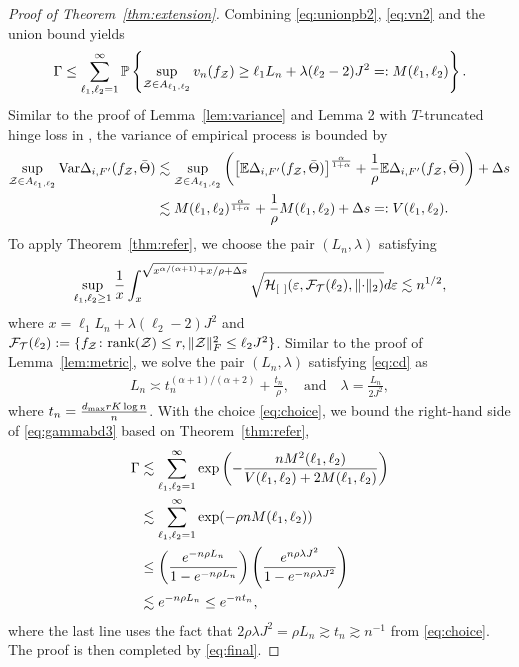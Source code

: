 \documentclass[twoside,11pt]{article}
\theoremstyle{plain}
\theoremstyle{definition}
\begin{document}
\begin{proof}[Proof of Theorem~\ref{thm:extension}]
Combining \eqref{eq:unionpb2},  \eqref{eq:vn2} and the union bound yields
\begin{align}\label{eq:gammabd3}
\Gamma\leq \sum_{\ell_1,\ell_2=1}^\infty\mathbb{P}\left\{\sup_{\mathcal{Z}\in A_{\ell_1,\ell_2}} v_n(f_{\mathcal{Z}})\geq  \ell_1 L_n+\lambda(\ell_2-2)J^2=:M(\ell_1,\ell_2) \right\}.
\end{align}
Similar to the proof of Lemma~\ref{lem:variance} and Lemma 2 with $T$-truncated hinge loss in \cite{lee2021nonparametric}, the variance of empirical process is bounded by 
\begin{align}
\sup_{\mathcal{Z}\in A_{\ell_1,\ell_2}}\textup{Var}\Delta_{i,F'}(f_{\mathcal{Z}},\bar \Theta)& \lesssim \sup_{\mathcal{Z}\in A_{\ell_1,\ell_2}}\left( \left[\mathbb{E}\Delta_{i,F'}(f_{\mathcal{Z}},\bar \Theta)\right]^{\alpha \over 1+\alpha}+{1\over \rho}\mathbb{E}\Delta_{i,F'}(f_{\mathcal{Z}},\bar \Theta)\right)+\Delta s \\&\lesssim M(\ell_1,\ell_2)^{\alpha\over 1+\alpha}+\frac{1}{\rho}M(\ell_1,\ell_2) +\Delta s =: V(\ell_1,\ell_2).
\end{align}
To apply Theorem~\ref{thm:refer}, we choose the pair $(L_n,\lambda)$ satisfying
\begin{align}\label{eq:cd}
\sup_{\ell_1,\ell_2\geq 1}{1\over x}\int_{x}^{\sqrt{x^{\alpha/(\alpha+1)}+x/\rho+\Delta s}}\sqrt{\tH_{[\ ]}(\varepsilon, \tF_{\tT}(\ell_2),\vnormSize{}{\cdot})}d\varepsilon \lesssim n^{1/2}, 
\end{align}
where $x=\ell_1 L_n+\lambda(\ell_2-2)J^2$ and $\mathcal{F}_{\mathcal{T}}(\ell_2):= \{f_{\mathcal{Z}}\colon \text{rank}(\mathcal{Z})\leq r, \lVert\mathcal{Z}\rVert_F^2\leq \ell_2J^2\}$.
Similar to the proof of Lemma~\ref{lem:metric}, we solve the pair $(L_n,\lambda)$ satisfying \eqref{eq:cd} as
\begin{align}\label{eq:choice}
L_n\asymp t_n^{(\alpha+1)/(\alpha+2)}+\frac{t_n}{\rho},\quad\text{and}\quad\lambda =  \frac{L_n}{2J^2},
\end{align}where $ t_n={d_{\max}rK\log n \over n}$.
With the choice \eqref{eq:choice}, we bound the right-hand side of \eqref{eq:gammabd3} based on Theorem~\ref{thm:refer}, 
\begin{align}\label{eq:gammabd4}
\Gamma&\lesssim \sum_{\ell_1,\ell_2=1}^\infty \exp\left(-\frac{nM^2(\ell_1,\ell_2)}{V(\ell_1,\ell_2)+2M(\ell_1,\ell_2)}\right)\\&\lesssim \sum_{\ell_1,\ell_2=1}^\infty	\exp(-\rho  n M(\ell_1,\ell_2))\\&\leq \left(e^{-n\rho L_n}\over 1-e^{-n\rho L_n}\right)\left(e^{n\rho \lambda J^2}\over 1-e^{-n\rho \lambda J^2}\right)\\&\lesssim e^{-n\rho L_n}\leq e^{-nt_n},
\end{align}
where the last line uses the fact that $2\rho\lambda J^2= \rho L_n\gtrsim t_n\gtrsim n^{-1}$ from \eqref{eq:choice}. The proof is then completed by \eqref{eq:final}.
\end{proof}
\end{document}
